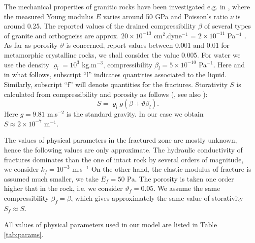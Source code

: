 \documentclass{article}
\begin{document}
The mechanical properties of granitic rocks have been investigated e.g. in \cite{Ljunggren1985}, where the measured Young modulus $E$ varies around 50 GPa and Poisson's ratio $\nu$ is around 0.25.
The reported values of the drained compressibility $\beta$ of several types of granite and orthogneiss are approx. $20\times 10^{-13}$ cm${}^2$.dyne${}^{-1}$ = $2\times10^{-11}$ Pa${}^{-1}$ \cite{Zisman1933}.
As far as porosity $\vartheta$ is concerned, \cite{intera} report values between 0.001 and 0.01 for metamorphic crystalline rocks, we shall consider the value 0.005.
For water we use the density $\varrho_l=10^3$ kg.m${}^{-3}$, compressibility $\beta_l=5\times 10^{-10}$ Pa${}^{-1}$.
Here and in what follows, subscript ``l'' indicates quantities associated to the liquid.
Similarly, subscript ``f'' will denote quantities for the fractures.
Storativity $S$ is calculated from compressibility and porosity as follows (\cite{Brace1968}, see also \cite{intera}):
\[ S = \varrho_l g(\beta + \vartheta\beta_l). \]
Here $g=9.81$ m.s${}^{-2}$ is the standard gravity.
In our case we obtain $S\approx 2\times 10^{-7} \mbox{ m}^{-1}$.

The values of physical parameters in the fractured zone are mostly unknown, hence the following values are only approximate.
The hydraulic conductivity of fractures dominates than the one of intact rock by several orders of magnitude, we consider $k_f=10^{-3}$ m.s${}^{-1}$
On the other hand, the elastic modulus of fracture is assumed much smaller, we take $E_f=50$ Pa.
The porosity is taken one order higher that in the rock, i.e. we consider $\vartheta_f=0.05$.
We assume the same compressibility $\beta_f=\beta$, which gives approximately the same value of storativity $S_f\approx S$.

All values of physical parameters used in our model are listed in Table \ref{tab:params}.
\end{document}
